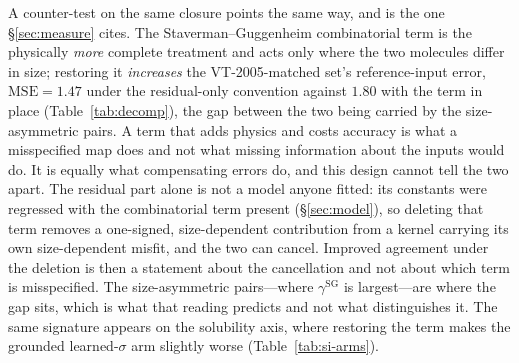 A counter-test on the same closure points the same way, and is the one \S\ref{sec:measure} cites.
The Staverman--Guggenheim combinatorial term is the physically \emph{more} complete treatment and
acts only where the two molecules differ in size; restoring it \emph{increases} the VT-2005-matched set's
reference-input error, $\mathrm{MSE}=1.47$ under the residual-only convention against
$1.80$ with the term in place (Table~\ref{tab:decomp}), the gap between the two being carried by the
size-asymmetric pairs. A term that adds physics and costs accuracy is what a misspecified map does
and not what missing information about the inputs would do. It is equally what compensating errors
do, and this design cannot tell the two apart. The residual part alone is not a model anyone fitted:
its constants were regressed with the combinatorial term present (\S\ref{sec:model}), so deleting
that term removes a one-signed, size-dependent contribution from a kernel carrying its own
size-dependent misfit, and the two can cancel. Improved agreement under the deletion is then a
statement about the cancellation and not about which term is misspecified. The size-asymmetric
pairs---where $\gamma^{\mathrm{SG}}$ is largest---are where the gap sits, which is what that reading
predicts and not what distinguishes it. The same signature appears on the
solubility axis, where restoring the term makes the grounded learned-$\sigma$ arm slightly worse
(Table~\ref{tab:si-arms}).


